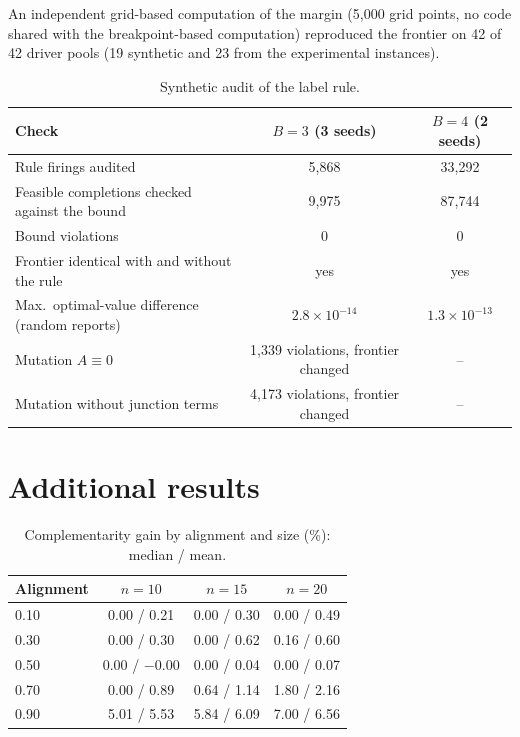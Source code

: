 \documentclass[review,12pt]{elsarticle}
\theoremstyle{definition}
\theoremstyle{remark}
\begin{document}
An independent grid-based computation of the margin (5,000 grid points,
no code shared with the breakpoint-based computation) reproduced the frontier
on 42 of 42 driver pools (19 synthetic and 23 from the experimental
instances).

\begin{table}[h]
\centering
\caption{Synthetic audit of the label rule.}
\label{tab:audit2}
\small
\begin{tabular}{lcc}
\toprule
Check & $B=3$ (3 seeds) & $B=4$ (2 seeds)\\
\midrule
Rule firings audited & 5,868 & 33,292\\
Feasible completions checked against the bound & 9,975 & 87,744\\
Bound violations & 0 & 0\\
Frontier identical with and without the rule & yes & yes\\
Max.\ optimal-value difference (random reports) & $2.8\times10^{-14}$ & $1.3\times10^{-13}$\\
Mutation $A\equiv0$ & 1,339 violations, frontier changed & --\\
Mutation without junction terms & 4,173 violations, frontier changed & --\\
\bottomrule
\end{tabular}
\end{table}

\section{Additional results}
\label{app:tables}

\begin{table}[h]
\centering
\caption{Complementarity gain by alignment and size (\%): median / mean.}
\label{tab:rq1n}
\small
\begin{tabular}{lccc}
\toprule
Alignment & $n=10$ & $n=15$ & $n=20$\\
\midrule
0.10 & 0.00 / 0.21 & 0.00 / 0.30 & 0.00 / 0.49\\
0.30 & 0.00 / 0.30 & 0.00 / 0.62 & 0.16 / 0.60\\
0.50 & 0.00 / $-$0.00 & 0.00 / 0.04 & 0.00 / 0.07\\
0.70 & 0.00 / 0.89 & 0.64 / 1.14 & 1.80 / 2.16\\
0.90 & 5.01 / 5.53 & 5.84 / 6.09 & 7.00 / 6.56\\
\bottomrule
\end{tabular}
\end{table}
\end{document}
